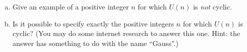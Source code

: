 \begin{exercise}{}
\begin{enumerate}[(a)]
\item
Give an example of a positive integer $n$ for which $U(n)$ is \emph{not} cyclic.
\item
Is it possible to specify exactly the positive integers $n$ for which $U(n)$ is cyclic?  (You may do some internet research to answer this one.  Hint: the answer has something to do with the name ``Gauss''.)
\end{enumerate}
\end{exercise}

%
